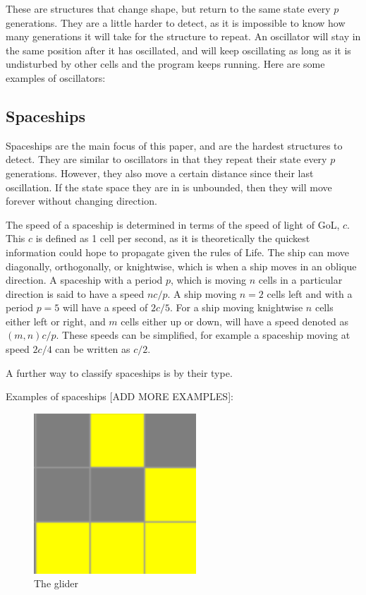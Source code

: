\documentclass{l4proj}
\begin{document}
These are structures that change shape, but return to the same state every $p$ generations. They are a little harder to detect, as it is impossible to know how many generations it will take for the structure to repeat. An oscillator will stay in the same position after it has oscillated, and will keep oscillating as long as it is undisturbed by other cells and the program keeps running. Here are some examples of oscillators:

\subsection{Spaceships}

Spaceships are the main focus of this paper, and are the hardest structures to detect. They are similar to oscillators in that they repeat their state every $p$ generations. However, they also move a certain distance since their last oscillation. If the state space they are in is unbounded, then they will move forever without changing direction.

The speed of a spaceship is determined in terms of the speed of light of GoL, $c$. This $c$ is defined as 1 cell per second, as it is theoretically the quickest information could hope to propagate given the rules of Life. The ship can move diagonally, orthogonally, or knightwise, which is when a ship moves in an oblique direction. A spaceship with a period $p$, which is moving $n$ cells in a particular direction is said to have a speed $nc/p$. A ship moving $n = 2$ cells left and with a period $p = 5$ will have a speed of $2c/5$. For a ship moving knightwise $n$ cells either left or right, and $m$ cells either up or down, will have a speed denoted as $(m, n)c/p$. These speeds can be simplified, for example a spaceship moving at speed $2c/4$ can be written as $c/2$.

A further way to classify spaceships is by their type. 

Examples of spaceships [ADD MORE EXAMPLES]:

\begin{figure}[h]
\includegraphics[width=0.9\linewidth, height=6cm]{dissertation/images/glider.png} 
\caption{The glider}
\label{fig:subim1}
\end{figure}
\end{document}
